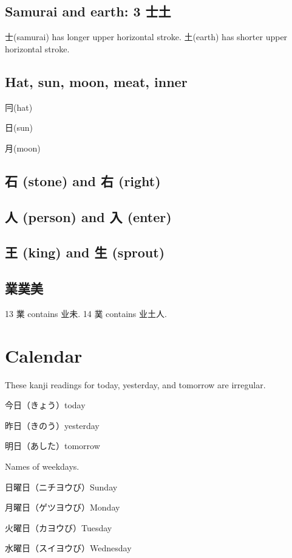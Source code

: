 \subsection{Samurai and earth: 3 士土}

士(samurai) has longer upper horizontal stroke.
土(earth) has shorter upper horizontal stroke.

\subsection{Hat, sun, moon, meat, inner}

冃(hat)

日(sun)

月(moon)

\subsection{石 (stone) and 右 (right)}

\subsection{人 (person) and 入 (enter)}

\subsection{王 (king) and 生 (sprout)}

\subsection{業菐美}

13 業 contains 业未.
14 菐 contains 业土人.

\section{Calendar}

These kanji readings for today, yesterday, and tomorrow are irregular.

今日（きょう）today

昨日（きのう）yesterday

明日（あした）tomorrow

Names of weekdays.

日曜日（ニチヨウび）Sunday

月曜日（ゲツヨウび）Monday

火曜日（カヨウび）Tuesday

水曜日（スイヨウび）Wednesday

